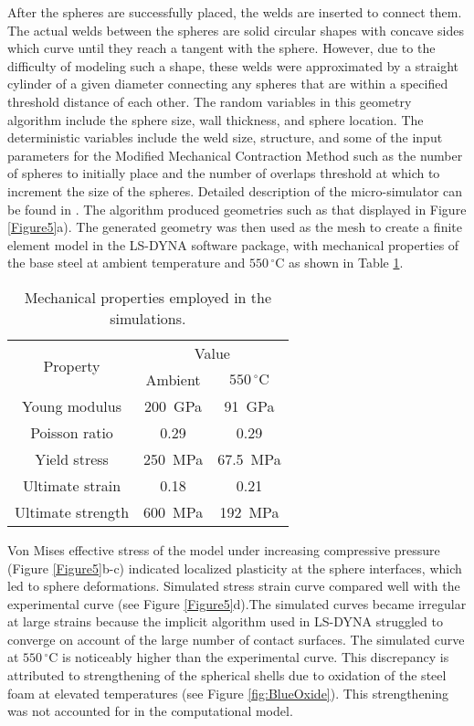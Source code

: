 \documentclass[review]{elsarticle}
\begin{document}
After the spheres are successfully placed, the welds are inserted to connect them. The actual welds between the spheres are solid circular shapes with concave sides which curve until they reach a tangent with the sphere. However, due to the difficulty of modeling such a shape, these welds were approximated by a straight cylinder of a given diameter connecting any spheres that are within a specified threshold distance of each other. The random variables in this geometry algorithm include the sphere size, wall thickness, and sphere location. The deterministic variables include the weld size, structure, and some of the input parameters for the Modified Mechanical Contraction Method such as the number of spheres to initially place and the number of overlaps threshold at which to increment the size of the spheres. Detailed description of the micro-simulator can be found in \cite{Smith2012}. The algorithm produced geometries such as that displayed in Figure \ref{Figure5}a). The generated geometry was then used as the mesh to create a finite element model in the LS-DYNA software package, with mechanical properties of the base steel at ambient temperature and $550\,^{\circ}\mathrm{C}$ as shown in Table \ref{Tab2}.



\begin{table}[htbp]
	\centering
	\caption{Mechanical properties employed in the simulations.}
	\begin{tabular}{ccc}
		\toprule
		\multirow{2}[0]{*}{Property} & \multicolumn{2}{c}{Value} \\
		& Ambient & $550\,^{\circ}\mathrm{C}$ \\
		\midrule
		Young modulus & 200 GPa & 91 GPa \\
		Poisson ratio & 0.29  & 0.29 \\
		Yield stress & 250 MPa & 67.5 MPa \\
		Ultimate strain & 0.18  & 0.21 \\
		Ultimate strength & 600 MPa & 192 MPa \\
		\bottomrule
	\end{tabular}%
	\label{Tab2}%
\end{table}%

Von Mises effective stress of the model under increasing compressive pressure (Figure \ref{Figure5}b-c) indicated localized plasticity at the sphere interfaces, which led to sphere deformations. Simulated stress strain curve compared well with the experimental curve (see Figure \ref{Figure5}d).The simulated curves became irregular at large strains because the implicit algorithm used in LS-DYNA struggled to converge on account of the large number of contact surfaces. The simulated curve at $550\,^{\circ}\mathrm{C}$ is noticeably higher than the experimental curve. This discrepancy is attributed to strengthening of the spherical shells due to oxidation of the steel foam at elevated temperatures (see Figure \ref{fig:BlueOxide}). This strengthening was not accounted for in the computational model.
\end{document}
